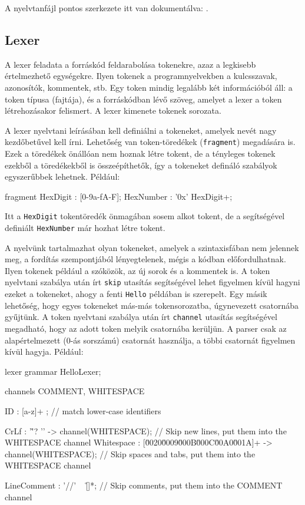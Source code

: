 \documentclass[12pt, a4paper]{report}
\newcommand{\f}[1]{\texttt{#1}}
\begin{document}
A nyelvtanfájl pontos szerkezete itt van dokumentálva: \cite{Antlr4Grammar}.

\subsection{Lexer}

A lexer feladata a forráskód feldarabolása tokenekre, azaz a legkisebb értelmezhető egységekre. Ilyen tokenek a programnyelvekben a kulcsszavak, azonosítók, kommentek, stb. Egy token mindig legalább két információból áll: a token típusa (fajtája), és a forráskódban lévő szöveg, amelyet a lexer a token létrehozásakor felismert. A lexer kimenete tokenek sorozata.

A lexer nyelvtani leírásában kell definiálni a tokeneket, amelyek nevét nagy kezdőbetűvel kell írni. Lehetőség van token-töredékek (\f{fragment}) megadására is. Ezek a töredékek önállóan nem hoznak létre tokent, de a tényleges tokenek ezekből a töredékekből is összeépíthetők, így a tokeneket defináló szabályok egyszerűbbek lehetnek. Például:

\begin{antlr4code}
fragment HexDigit : [0-9a-fA-F];
HexNumber : '0x' HexDigit+;
\end{antlr4code}

Itt a \f{HexDigit} tokentöredék önmagában sosem alkot tokent, de a segítségével definiált \f{HexNumber} már hozhat létre tokent.

A nyelvünk tartalmazhat olyan tokeneket, amelyek a szintaxisfában nem jelennek meg, a fordítás szempontjából lényegtelenek, mégis a kódban előfordulhatnak. Ilyen tokenek például a szóközök, az új sorok és a kommentek is. A token nyelvtani szabálya után írt \f{skip} utasítás segítségével lehet figyelmen kívül hagyni ezeket a tokeneket, ahogy a fenti \f{Hello} példában is szerepelt. Egy másik lehetőség, hogy egyes tokeneket más-más tokensorozatba, úgynevezett csatornába gyűjtünk. A token nyelvtani szabálya után írt \f{channel} utasítás segítségével megadható, hogy az adott token melyik csatornába kerüljün. A parser csak az alapértelmezett (0-ás sorszámú) csatornát használja, a többi csatornát figyelmen kívül hagyja. Például:

\begin{antlr4code}
lexer grammar HelloLexer;

channels
{
	COMMENT,
	WHITESPACE
}

ID : [a-z]+ ; // match lower-case identifiers

CrLf : '\r'? '\n' -> channel(WHITESPACE);  // Skip new lines, put them into the WHITESPACE channel
Whitespace : [\u0020\u0009\u000B\u000C\u00A0\u001A]+ -> channel(WHITESPACE); // Skip spaces and tabs, put them into the WHITESPACE channel

LineComment : '//' ~ [\r\n]*; // Skip comments, put them into the COMMENT channel
\end{antlr4code}
\end{document}
